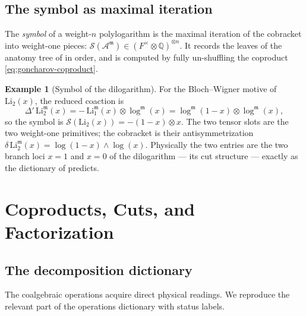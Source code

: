 \documentclass[12pt]{article}
\theoremstyle{definition}
\newtheorem{example}[theorem]{Example}
\theoremstyle{remark}
\newcommand{\Amm}{\mathcal{A}^{\mathfrak{m}}}
\newcommand{\Li}{\mathrm{Li}}
\newcommand{\coA}{\Delta}
\newcommand{\cobr}{\delta}
\newcommand{\Qbb}{\mathbb{Q}}
\begin{document}
\subsection{The symbol as maximal iteration}

The \emph{symbol} of a weight-$n$ polylogarithm is the maximal iteration of the cobracket
into weight-one pieces: $\mathcal{S}(\Amm)\in (F^\times\otimes\Qbb)^{\otimes n}$. It records
the leaves of the anatomy tree of  in order, and is computed by fully
un-shuffling the coproduct \eqref{eq:goncharov-coproduct}.

\begin{example}[Symbol of the dilogarithm]
\label{ex:dilog-symbol}
For the Bloch--Wigner motive of $\Li_2(x)$, the reduced coaction is
\[
\coA'\,\Li_2^{\mathfrak m}(x) = -\,\Li_1^{\mathfrak m}(x)\otimes\log^{\mathfrak m}(x)
= \log^{\mathfrak m}(1-x)\otimes\log^{\mathfrak m}(x),
\]
so the symbol is $\mathcal{S}(\Li_2(x))=-(1-x)\otimes x$. The two tensor slots are the two
weight-one primitives; the cobracket is their antisymmetrization
$\cobr\,\Li_2^{\mathfrak m}(x)=\log(1-x)\wedge\log(x)$. Physically the two entries are the two
branch loci $x=1$ and $x=0$ of the dilogarithm --- its cut structure --- exactly as the
dictionary of  predicts.
\end{example}

\section{Coproducts, Cuts, and Factorization}
\label{sec:cuts}

\subsection{The decomposition dictionary}

The coalgebraic operations acquire direct physical readings. We reproduce the relevant part
of the operations dictionary with status labels.
\end{document}
